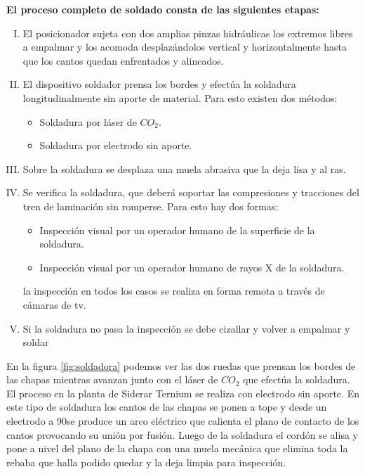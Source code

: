 \textbf{El proceso completo de soldado consta de las siguientes etapas:}

\begin{enumerate}[I)]
	\item El posicionador sujeta con dos amplias pinzas hidráulicas los extremos libres a empalmar y los acomoda desplazándolos vertical y horizontalmente hasta que los cantos quedan enfrentados y alineados.
	\item El dispositivo soldador prensa los bordes y efectúa la soldadura longitudinalmente sin aporte de material. Para esto existen dos métodos:
		\begin{itemize}
			\item Soldadura por láser de $CO_{2}$. 
			\item Soldadura por electrodo sin aporte.
		\end{itemize}
	\item Sobre la soldadura se desplaza una muela abrasiva que la deja lisa y al ras.
	\item Se verifica la soldadura, que deberá soportar las compresiones y tracciones del tren de laminación sin romperse. Para esto hay dos formas:
		\begin{itemize}
			\item Inspección visual por un operador humano de la superficie de la soldadura.
			\item Inspección visual por un operador humano de rayos X de la soldadura.
		\end{itemize}
		la inspección en todos los casos se realiza en forma remota a través de cámaras de tv.
	\item Si la soldadura no pasa la inspección se debe cizallar y volver a empalmar y soldar
\end{enumerate}

En la figura \ref{fig:soldadora} podemos ver las dos ruedas que prensan los bordes de las chapas mientras avanzan junto con el láser de $CO_{2}$ que efectúa la soldadura. 
El proceso en la planta de Siderar Ternium se realiza con electrodo sin aporte. En este tipo de soldadura los cantos de las chapas se ponen a tope y desde un electrodo a 90\textdegree se produce un arco eléctrico que calienta el plano de contacto de los cantos provocando su unión por fusión. Luego de la soldadura el cordón se alisa y pone a nivel del plano de la chapa con una muela mecánica que elimina toda la rebaba que halla podido quedar y la deja limpia para inspección.  	

